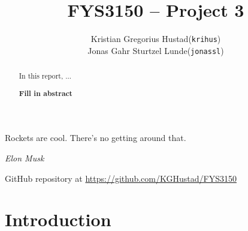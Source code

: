 \documentclass[a4paper]{article}
\begin{document}
\title{FYS3150 -- Project 3}
\author{
    \begin{tabular}{r l}
        Kristian Gregorius Hustad & (\texttt{krihus})\\
        Jonas Gahr Sturtzel Lunde & (\texttt{jonassl})
    \end{tabular}}

\maketitle




\setlength{\epigraphwidth}{0.75\textwidth}
\renewcommand{\epigraphflush}{center}
\renewcommand{\beforeepigraphskip}{50pt}
\renewcommand{\afterepigraphskip}{100pt}
\renewcommand{\epigraphsize}{\normalsize}

\epigraph{Rockets are cool. There's no getting around that.}
{\textit{Elon Musk}}


\begin{abstract}
\noindent
In this report, ...

\textbf{Fill in abstract}
\end{abstract}

\vfill


\begin{center}
    GitHub repository at \url{https://github.com/KGHustad/FYS3150}
\end{center}

\newpage

\newcommand{\half}{\frac{1}{2}}
\newcommand{\dt}{{\Delta t}}
\newcommand{\dx}{{\Delta x}}
\newcommand{\bigO}{{\mathcal{O}}}

\newcommand{\supnew}{^{\mathrm{new}}}



\section{Introduction}\label{sec:intro}
\cite{mhj_lecture_notes} %
\end{document}
